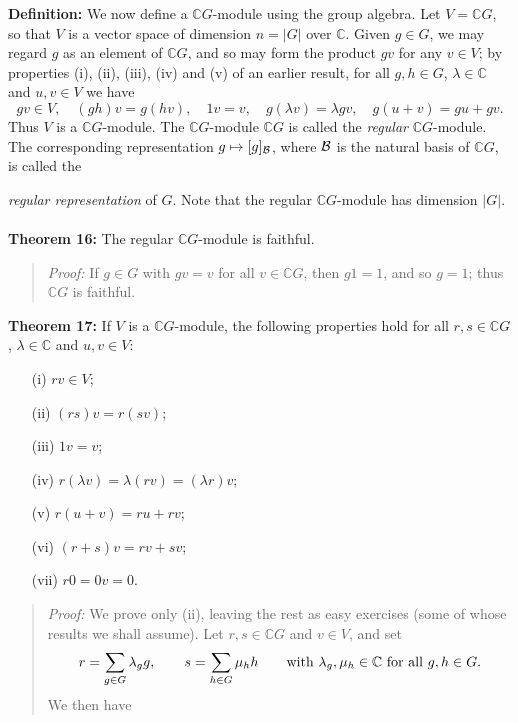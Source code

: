 {\bf Definition:}
We now define a ${\mathbb C}G$-module using the group algebra. Let $V={\mathbb C}G$, so that
$V$ is a vector space of dimension $n=|G|$ over ${\mathbb C}$. Given $g\in G$, we may
regard $g$ as an element of ${\mathbb C}G$, and so may form the product $gv$ for any
$v \in V$; by properties (i), (ii), (iii), (iv) and (v) of an earlier result,
for all $g,h \in G$, $\lambda \in {\mathbb C}$ and $u,v \in V$ we have
$$gv \in V,\quad (gh)v=g(hv),\quad 1v=v,\quad g(\lambda v)=\lambda gv,\quad
g(u+v)=gu+gv.$$
Thus $V$ is a ${\mathbb C}G$-module.
The ${\mathbb C}G$-module ${\mathbb C}G$ is called the \emph{regular}
${\mathbb C}G$-module. The corresponding representation $g\mapsto[g]_{\cal B}$, where ${\cal B}$ is
the natural basis of ${\mathbb C}G$, is called the {\emph{regular representation} of
$G$.
Note that the regular ${\mathbb C}G$-module has dimension $|G|$.
\\
\\
{\bf Theorem 16:} The regular ${\mathbb C}G$-module is faithful.
\begin{quote}
\emph{Proof:}
If $g\in G$ with $gv=v$ for all $v\in{\mathbb C}G$, then $g1=1$, and so $g=1$; 
thus ${\mathbb C}G$ is faithful.
\end{quote}
{\bf Theorem 17:} If $V$ is a ${\mathbb C}G$-module, the following
properties hold for all $r,s\in{\mathbb C}G$, $\lambda\in{\mathbb C}$ and $u,v\in V$:
\begin{itemize}
\item[(i)] $rv\in V$;
\item[(ii)] $(rs)v=r(sv)$;
\item[(iii)] $1v=v$;
\item[(iv)] $r(\lambda v)=\lambda(rv)=(\lambda r)v$;
\item[(v)] $r(u+v)=ru+rv$;
\item[(vi)] $(r+s)v=rv+sv$;
\item[(vii)] $r0=0v=0$.
\end{itemize}
\begin{quote}
\emph{Proof:}
We prove only (ii), leaving the rest as easy
exercises (some of whose results we shall assume). Let $r,s\in{\mathbb C}G$ and
$v\in V$, and set
$$r=\sum_{g\in G}\lambda_gg,\qquad s=\sum_{h\in G}\mu_hh\qquad\hbox{with }
\lambda_g,\mu_h\in{\mathbb C}\hbox{ for all }g,h\in G.$$
We then have


\end{quote}}
